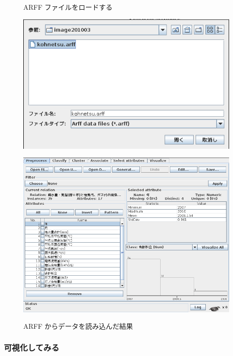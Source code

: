 \documentclass[mingoth,a4paper]{jsarticle}
\begin{document}
\begin{figure}[H]
 \begin{minipage}{0.5\hsize}
  \begin{center}
   \caption{ARFF ファイルをロードする}
   \label{fig:wekaarffload}
   \includegraphics[width=0.9\hsize]{image201003/weka2.png}
  \end{center}
 \end{minipage}
 \begin{minipage}{0.5\hsize}
  \begin{center}
   \caption{ARFF からデータを読み込んだ結果}
   \includegraphics[width=0.9\hsize]{image201003/weka3.png}
   \label{fig:wekaarffread}
  \end{center}
 \end{minipage}
\end{figure}

\subsubsection{可視化してみる}
\end{document}

